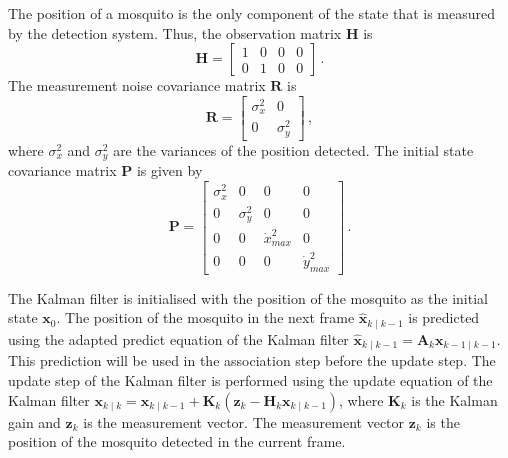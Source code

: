 The position of a mosquito is the only component of the state that is measured by the detection system. Thus, the observation matrix $\mathbf{H}$ is
\begin{equation}
  \mathbf{H} = \begin{bmatrix}
    1 & 0 & 0 & 0 \\
    0 & 1 & 0 & 0
  \end{bmatrix}\,.
\end{equation}
The measurement noise covariance matrix $\mathbf{R}$ is
\begin{equation}
  \mathbf{R} = \begin{bmatrix}
    \sigma_{x}^2 & 0            \\
    0            & \sigma_{y}^2
  \end{bmatrix}\,,
\end{equation}
where $\sigma_{x}^2$ and $\sigma_{y}^2$ are the variances of the position detected. The initial state covariance matrix $\mathbf{P}$ is given by
\begin{equation}
  \mathbf{P} = \begin{bmatrix}
    \sigma_{x}^2 & 0            & 0               & 0               \\
    0            & \sigma_{y}^2 & 0               & 0               \\
    0            & 0            & \dot{x}_{max}^2 & 0               \\
    0            & 0            & 0               & \dot{y}_{max}^2
  \end{bmatrix}\,.
\end{equation}

The Kalman filter is initialised with the position of the mosquito as the initial state $\mathbf{x}_0$. The position of the mosquito in the next frame $\mathbf{\hat{x}}_{k\mid k-1}$ is predicted using the adapted predict equation of the Kalman filter $\mathbf{\hat{x}}_{k\mid k-1} = \mathbf{A}_k \mathbf{x}_{k-1\mid k-1}$. This prediction will be used in the association step before the update step. The update step of the Kalman filter is performed using the update equation of the Kalman filter $\mathbf{x}_{k\mid k} = \mathbf{x}_{k\mid k-1} + \mathbf{K}_k \left(\mathbf{z}_k - \mathbf{H}_k \mathbf{x}_{k\mid k-1}\right)$, where $\mathbf{K}_k$ is the Kalman gain and $\mathbf{z}_k$ is the measurement vector. The measurement vector $\mathbf{z}_k$ is the position of the mosquito detected in the current frame.


